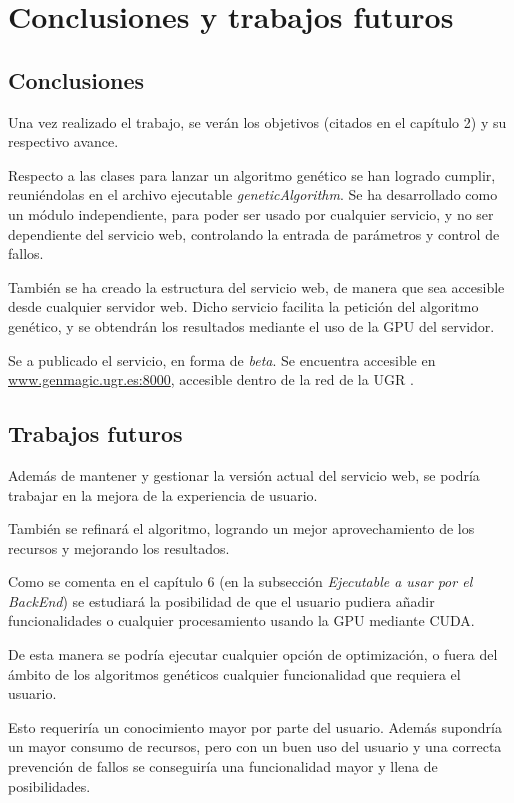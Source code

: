 \chapter{Conclusiones y trabajos futuros}


\bigskip
\section{Conclusiones}
\bigskip

Una vez realizado el trabajo, se verán los objetivos (citados en el capítulo 2) y su respectivo avance.

\bigskip
Respecto a las clases para lanzar un algoritmo genético se han logrado cumplir, reuniéndolas en el archivo ejecutable \textit{geneticAlgorithm}. Se ha desarrollado como un módulo independiente, para poder ser usado por cualquier servicio, y no ser dependiente del servicio web, controlando la entrada de parámetros y control de fallos.

\bigskip
También se ha creado la estructura del servicio web, de manera que sea accesible desde cualquier servidor web.
Dicho servicio facilita la petición del algoritmo genético, y se obtendrán los resultados mediante el uso de la GPU del servidor.

\bigskip
Se a publicado el servicio, en forma de \textit{beta}. Se encuentra accesible en  \href{www.genmagic.ugr.es:8000}{www.genmagic.ugr.es:8000}, accesible dentro de la red de la UGR \cite{vpnugr}.
	

\section{Trabajos futuros}

\bigskip
Además de mantener y gestionar la versión actual del servicio web, se podría trabajar en la mejora de la experiencia de usuario.

\bigskip
También se refinará el algoritmo, logrando un mejor aprovechamiento de los recursos y mejorando los resultados.

\bigskip
Como se comenta en el capítulo 6 (en la subsección \textit{Ejecutable a usar por el BackEnd}) se estudiará la posibilidad de que el usuario pudiera añadir funcionalidades o cualquier procesamiento usando la GPU mediante CUDA. 

\bigskip
De esta manera se podría ejecutar cualquier opción de optimización, o fuera del ámbito de los algoritmos genéticos cualquier funcionalidad que requiera el usuario.

\bigskip
Esto requeriría un conocimiento mayor por parte del usuario. Además supondría un mayor consumo de recursos, pero con un buen uso del usuario y una correcta prevención de fallos se conseguiría una funcionalidad mayor y llena de posibilidades. 









